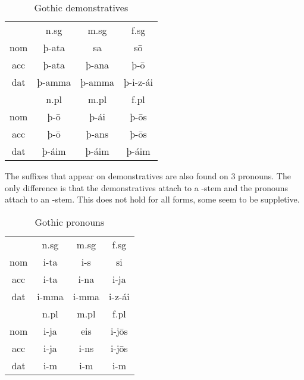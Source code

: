 \begin{table}[H]
	\center
	\caption {Gothic demonstratives}
		\begin{tabular}{cccc}
		\toprule
							& \ac{n}.\ac{sg} 	& \ac{m}.\ac{sg}	& \ac{f}.\ac{sg}  \\
		 						\cmidrule{2-4}
    \ac{nom} 	& þ-ata 	 			  & sa  			  		& sō		    			\\
    \ac{acc}	& þ-ata    	   		& þ-ana  	  	 		& þ-ō     				\\
    \ac{dat} 	& þ-amma 		   		& þ-amma  				& þ-i-z-ái  			\\
		\bottomrule
    					& \ac{n}.\ac{pl}	& \ac{m}.\ac{pl}	& \ac{f}.\ac{pl}	\\
						    \cmidrule{2-4}
    \ac{nom} 	& þ-ō		     			&	þ-ái   					&	þ-ōs	  				\\
    \ac{acc} 	& þ-ō    					&	þ-ans   				&	þ-ōs	   				\\
    \ac{dat} 	& þ-áim   				&	þ-áim    				&	þ-áim   				\\
    \bottomrule
		\end{tabular}
\end{table}

The suffixes that appear on demonstratives are also found on 3 pronouns. The only difference is that the demonstratives attach to a -stem and the pronouns attach to an -stem. This does not hold for all forms, some seem to be suppletive.

\begin{table}[H]
	\center
	\caption {Gothic  pronouns}
		\begin{tabular}{cccc}
		\toprule
							& \ac{n}.\ac{sg} 	& \ac{m}.\ac{sg}	& \ac{f}.\ac{sg}  \\
		 						\cmidrule{2-4}
    \ac{nom} 	& i-ta   	 			  & i-s  			  		& si		    			\\
    \ac{acc}	& i-ta    	   		& i-na  	  	 		& i-ja     				\\
    \ac{dat} 	& i-mma 		   		& i-mma  			   	& i-z-ái  	  		\\
		\bottomrule
    					& \ac{n}.\ac{pl}	& \ac{m}.\ac{pl}	& \ac{f}.\ac{pl}	\\
						    \cmidrule{2-4}
    \ac{nom} 	& i-ja  					&	eis    					&	i-jōs  					\\
    \ac{acc} 	& i-ja   					&	i-ns    				&	i-jōs 					\\
    \ac{dat} 	& i-m     				&	i-m      				&	i-m     				\\
    \bottomrule
		\end{tabular}
\end{table}







